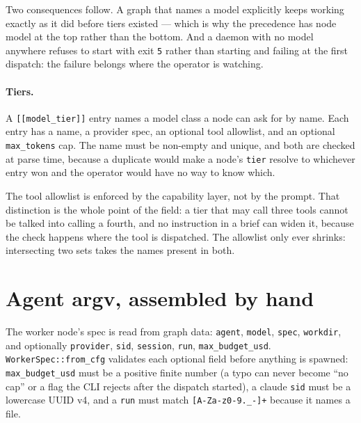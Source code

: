 Two consequences follow. A graph that names a model explicitly keeps working exactly as it did
before tiers existed --- which is why the precedence has node model at the top rather than the
bottom. And a daemon with no model anywhere refuses to start with exit \texttt{5} rather than
starting and failing at the first dispatch: the failure belongs where the operator is
watching.

\paragraph{Tiers.} A \texttt{[[model\_tier]]} entry names a model class a node can ask for by
name. Each entry has a name, a provider spec, an optional tool allowlist, and an optional
\texttt{max\_tokens} cap. The name must be non-empty and unique, and both are checked at parse
time, because a duplicate would make a node's \texttt{tier} resolve to whichever entry won and
the operator would have no way to know which.

The tool allowlist is enforced by the capability layer, not by the prompt. That distinction is
the whole point of the field: a tier that may call three tools cannot be talked into calling a
fourth, and no instruction in a brief can widen it, because the check happens where the tool
is dispatched. The allowlist only ever shrinks: intersecting two sets takes the names present
in both.

\section{Agent argv, assembled by hand}

The worker node's spec is read from graph data: \texttt{agent}, \texttt{model}, \texttt{spec},
\texttt{workdir}, and optionally \texttt{provider}, \texttt{sid}, \texttt{session},
\texttt{run}, \texttt{max\_budget\_usd}. \texttt{WorkerSpec::from\_cfg} validates each
optional field before anything is spawned: \texttt{max\_budget\_usd} must be a positive finite
number (a typo can never become ``no cap'' or a flag the CLI rejects after the dispatch
started), a claude \texttt{sid} must be a lowercase UUID v4, and a \texttt{run} must match
\texttt{[A-Za-z0-9.\_-]+} because it names a file.

